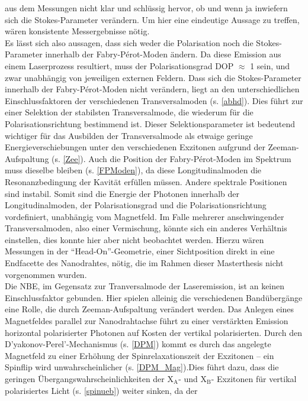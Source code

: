 aus dem Messungen nicht klar und schlüssig hervor, ob und wenn ja inwiefern sich
die Stokes-Parameter verändern. Um hier eine eindeutige Aussage zu treffen,
wären konsistente Messergebnisse nötig.\\ Es lässt sich also aussagen, dass sich
weder die Polarisation noch die Stokes-Parameter innerhalb der Fabry-Pérot-Moden
ändern. Da diese Emission aus einem Laserprozess resultiert, muss der
Polarisationsgrad DOP $\approx$ 1 sein, und zwar unabhängig von jeweiligen
externen Feldern. Dass sich die Stokes-Parameter innerhalb der Fabry-Pérot-Moden
nicht verändern, liegt an den unterschiedlichen Einschlussfaktoren der
verschiedenen Transversalmoden (s. \autoref{abhd}). Dies führt zur einer
Selektion der stabilsten Transversalmode, die wiederum für die
Polarisationsrichtung bestimmend ist. Dieser Selektionsparameter ist bedeutend
wichtiger für das Ausbilden der Transversalmode als etwaige geringe
Energieverschiebungen unter den verschiedenen Exzitonen aufgrund der
Zeeman-Aufspaltung (s. \autoref{Zee}). Auch die Position der Fabry-Pérot-Moden
im Spektrum muss dieselbe bleiben (s. \autoref{FPModen}), da diese
Longitudinalmoden die Resonanzbedingung der Kavität erfüllen müssen. Andere
spektrale Positionen sind instabil. Somit sind die Energie der Photonen
innerhalb der Longitudinalmoden, der Polarisationsgrad und die
Polarisationsrichtung vordefiniert, unabhängig vom Magnetfeld. Im Falle mehrerer
anschwingender Transversalmoden, also einer Vermischung, könnte sich ein anderes
Verhältnis einstellen, dies konnte hier aber nicht beobachtet werden. Hierzu
wären Messungen in der ``Head-On''-Geometrie, einer Sichtposition direkt in eine
Endfacette des Nanodrahtes, nötig, die im Rahmen dieser Masterthesis nicht
vorgenommen wurden.\\ Die NBE, im Gegensatz zur Tranversalmode der
Laseremission, ist an keinen Einschlussfaktor gebunden. Hier spielen alleinig
die verschiedenen Bandübergänge eine Rolle, die durch Zeeman-Aufspaltung
verändert werden. Das Anlegen eines Magnetfeldes parallel zur Nanodrahtachse
führt zu einer verstärkten Emission horizontal polarisierter Photonen auf Kosten
der vertikal polarisierten. Durch den D'yakonov-Perel'-Mechanismus (s.
\autoref{DPM}) kommt es durch das angelegte Magnetfeld zu einer Erhöhung der
Spinrelaxationszeit der Exzitonen – ein Spinflip wird unwahrscheinlicher (s.
\autoref{DPM_Mag}).\FloatBarrier \noindent Dies führt dazu, dass die geringen
Übergangswahrscheinlichkeiten der X$_\text{A}$- und X$_\text{B}$- Exzitonen für
vertikal polarisiertes Licht (s. \autoref{spinueb}) weiter sinken, da der
